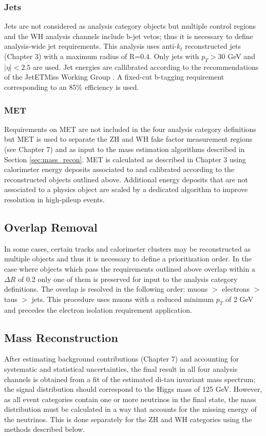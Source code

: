 \subsubsection{Jets}
Jets are not considered as analysis category objects but multiple control regions and the WH analysis channels include b-jet vetos; thus it is necessary to define analysis-wide jet requirements. This analysis uses anti-$k_t$ reconstructed jets (Chapter 3) with a maximum radius of R=0.4. Only jets with $p_T>$30 GeV and $|\eta|<2.5$ are used. Jet energies are callibrated according to the recommendations of the JetETMiss Working Group \cite{jet_met_cp}. A fixed-cut b-tagging requirement corresponding to an 85\% efficiency is used.

\subsubsection{MET}
Requirements on MET are not included in the four analysis category definitions but MET is used to separate the ZH and WH fake factor measurement regions (see Chapter 7) and as input to the mass estimation algorithms described in Section \ref{sec:mass_recon}. MET is calculated as described in Chapter 3 using calorimeter energy deposits associated to and calibrated according to the reconstructed objects outlined above. Additional energy deposits that are not associated to a physics object are scaled by a dedicated algorithm to improve resolution in high-pileup events.

\subsection{Overlap Removal}\label{sec:overlap}
In some cases, certain tracks and calorimeter clusters may be reconstructed as multiple objects and thus it is necessary to define a prioritization order. In the case where objects which pass the requirements outlined above overlap within a $\Delta R$ of 0.2 only one of them is preserved for input to the analysis category definitions. The overlap is resolved in the following order: muons $>$ electrons $>$ taus $>$ jets. This procedure uses muons with a reduced minimum $p_T$ of 2 GeV and precedes the electron isolation requirement application.

\subsection{Mass Reconstruction}
After estimating background contributions (Chapter 7) and accounting for systematic and statistical uncertainties, the final result in all four analysis channels is obtained from a fit of the estimated di-tau invariant mass spectrum; the signal distribution should correspond to the Higgs mass of 125 GeV. However, as all event categories contain one or more neutrinos in the final state, the mass distribution must be calculated in a way that accounts for the missing energy of the neutrinos. This is done separately for the ZH and WH categories using the methods described below.

